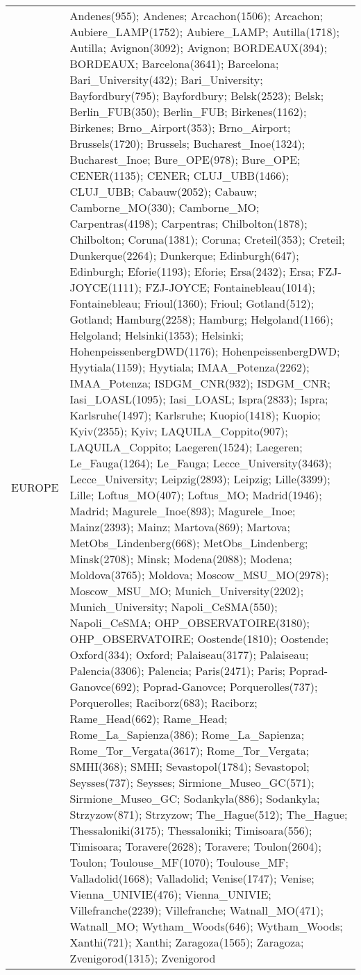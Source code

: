 \documentclass[journal abbreviation, manuscript]{copernicus}
\begin{document}
\begin{table}
 \tiny
 \begin{tabularx}{\textwidth}{lX}
  \middlehline
  EUROPE    & Andenes(955); Andenes; Arcachon(1506); Arcachon; Aubiere\_LAMP(1752); Aubiere\_LAMP; Autilla(1718); Autilla; Avignon(3092); Avignon; BORDEAUX(394); BORDEAUX; Barcelona(3641); Barcelona; Bari\_University(432); Bari\_University; Bayfordbury(795); Bayfordbury; Belsk(2523); Belsk; Berlin\_FUB(350); Berlin\_FUB; Birkenes(1162); Birkenes; Brno\_Airport(353); Brno\_Airport; Brussels(1720); Brussels; Bucharest\_Inoe(1324); Bucharest\_Inoe; Bure\_OPE(978); Bure\_OPE; CENER(1135); CENER; CLUJ\_UBB(1466); CLUJ\_UBB; Cabauw(2052); Cabauw; Camborne\_MO(330); Camborne\_MO; Carpentras(4198); Carpentras; Chilbolton(1878); Chilbolton; Coruna(1381); Coruna; Creteil(353); Creteil; Dunkerque(2264); Dunkerque; Edinburgh(647); Edinburgh; Eforie(1193); Eforie; Ersa(2432); Ersa; FZJ-JOYCE(1111); FZJ-JOYCE; Fontainebleau(1014); Fontainebleau; Frioul(1360); Frioul; Gotland(512); Gotland; Hamburg(2258); Hamburg; Helgoland(1166); Helgoland; Helsinki(1353); Helsinki; HohenpeissenbergDWD(1176); HohenpeissenbergDWD; Hyytiala(1159); Hyytiala; IMAA\_Potenza(2262); IMAA\_Potenza; ISDGM\_CNR(932); ISDGM\_CNR; Iasi\_LOASL(1095); Iasi\_LOASL; Ispra(2833); Ispra; Karlsruhe(1497); Karlsruhe; Kuopio(1418); Kuopio; Kyiv(2355); Kyiv; LAQUILA\_Coppito(907); LAQUILA\_Coppito; Laegeren(1524); Laegeren; Le\_Fauga(1264); Le\_Fauga; Lecce\_University(3463); Lecce\_University; Leipzig(2893); Leipzig; Lille(3399); Lille; Loftus\_MO(407); Loftus\_MO; Madrid(1946); Madrid; Magurele\_Inoe(893); Magurele\_Inoe; Mainz(2393); Mainz; Martova(869); Martova; MetObs\_Lindenberg(668); MetObs\_Lindenberg; Minsk(2708); Minsk; Modena(2088); Modena; Moldova(3765); Moldova; Moscow\_MSU\_MO(2978); Moscow\_MSU\_MO; Munich\_University(2202); Munich\_University; Napoli\_CeSMA(550); Napoli\_CeSMA; OHP\_OBSERVATOIRE(3180); OHP\_OBSERVATOIRE; Oostende(1810); Oostende; Oxford(334); Oxford; Palaiseau(3177); Palaiseau; Palencia(3306); Palencia; Paris(2471); Paris; Poprad-Ganovce(692); Poprad-Ganovce; Porquerolles(737); Porquerolles; Raciborz(683); Raciborz; Rame\_Head(662); Rame\_Head; Rome\_La\_Sapienza(386); Rome\_La\_Sapienza; Rome\_Tor\_Vergata(3617); Rome\_Tor\_Vergata; SMHI(368); SMHI; Sevastopol(1784); Sevastopol; Seysses(737); Seysses; Sirmione\_Museo\_GC(571); Sirmione\_Museo\_GC; Sodankyla(886); Sodankyla; Strzyzow(871); Strzyzow; The\_Hague(512); The\_Hague; Thessaloniki(3175); Thessaloniki; Timisoara(556); Timisoara; Toravere(2628); Toravere; Toulon(2604); Toulon; Toulouse\_MF(1070); Toulouse\_MF; Valladolid(1668); Valladolid; Venise(1747); Venise; Vienna\_UNIVIE(476); Vienna\_UNIVIE; Villefranche(2239); Villefranche; Watnall\_MO(471); Watnall\_MO; Wytham\_Woods(646); Wytham\_Woods; Xanthi(721); Xanthi; Zaragoza(1565); Zaragoza; Zvenigorod(1315); Zvenigorod                                                                                                                                                                                                                                                                                                                                                                                             
\end{tabularx}
\end{table}
\end{document}
